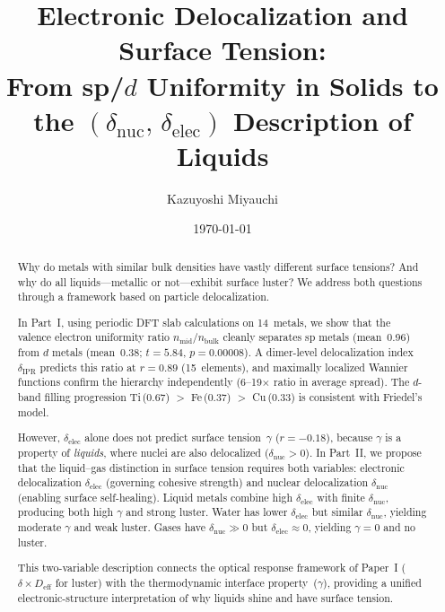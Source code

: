 \documentclass[twocolumn,showpacs,preprintnumbers,amsmath,amssymb,prb]{revtex4-2}
\begin{document}

\title{Electronic Delocalization and Surface Tension:\\
From sp/$d$ Uniformity in Solids to the
$(\delta_\mathrm{nuc},\,\delta_\mathrm{elec})$ Description of Liquids}

\author{Kazuyoshi Miyauchi}

\date{\today}

\begin{abstract}
Why do metals with similar bulk densities have vastly different
surface tensions?
And why do all liquids---metallic or not---exhibit surface luster?
We address both questions through a framework based on
particle delocalization.

In Part~I, using periodic DFT slab calculations on 14~metals,
we show that the valence electron uniformity ratio
$n_\mathrm{mid}/n_\mathrm{bulk}$ cleanly separates sp metals
(mean~0.96) from $d$ metals (mean~0.38;
$t = 5.84$, $p = 0.00008$).
A dimer-level delocalization index $\delta_\mathrm{IPR}$
predicts this ratio at $r = 0.89$ (15~elements), and
maximally localized Wannier functions confirm the hierarchy
independently (6--19$\times$ ratio in average spread).
The $d$-band filling progression
Ti\,(0.67) $>$ Fe\,(0.37) $>$ Cu\,(0.33)
is consistent with Friedel's model.

However, $\delta_\mathrm{elec}$ alone does not predict
surface tension~$\gamma$ ($r = -0.18$), because $\gamma$
is a property of \emph{liquids}, where nuclei are also
delocalized ($\delta_\mathrm{nuc} > 0$).
In Part~II, we propose that the liquid--gas distinction in
surface tension requires both variables:
electronic delocalization $\delta_\mathrm{elec}$ (governing
cohesive strength) and nuclear delocalization $\delta_\mathrm{nuc}$
(enabling surface self-healing).
Liquid metals combine high $\delta_\mathrm{elec}$ with finite
$\delta_\mathrm{nuc}$, producing both high $\gamma$ and strong
luster.
Water has lower $\delta_\mathrm{elec}$ but similar
$\delta_\mathrm{nuc}$, yielding moderate $\gamma$ and weak luster.
Gases have $\delta_\mathrm{nuc} \gg 0$ but
$\delta_\mathrm{elec} \approx 0$, yielding $\gamma = 0$
and no luster.

This two-variable description connects the optical response
framework of Paper~I ($\delta \times D_\mathrm{eff}$ for luster)
with the thermodynamic interface property~($\gamma$),
providing a unified electronic-structure interpretation
of why liquids shine and have surface tension.
\end{abstract}
\end{document}
